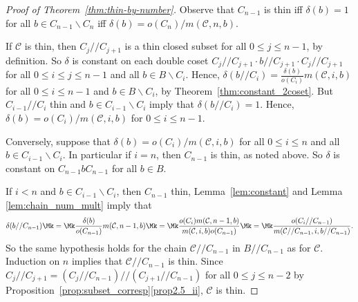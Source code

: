 \begin{proof} [Proof of Theorem~\ref{thm:thin-by-number}]

Observe that $C_{n-1}$ is thin iff $\delta(b) = 1$ for all $b \in
C_{n-1}\backslash C_n$ iff $\delta(b) =
o(C_n)/m(\mathcal{C}, n, b)$.

If $\mathcal{C}$ is thin, then $C_j//C_{j+1}$ is a thin closed subset
for all $0 \leq j \leq n-1$, by definition. So $\delta$ is constant on
each double coset $C_j//C_{j+1}\cdot b//C_{j+1}\cdot C_j//C_{j+1}$ for
all $0 \leq i \leq j \leq n-1$ and all $b \in B\backslash C_i$. Hence, $\delta(b//C_i) =
\frac{\delta(b)}{o(C_i)}m(\mathcal{C}, i, b)$ for all $0 \leq i \leq
n-1$ and $b \in B\backslash C_i$, by Theorem~\ref{thm:constant_2coset}.
But $C_{i-1}//C_i$ thin and $b \in C_{i-1}\backslash C_i$ imply that
$\delta(b//C_i) = 1$. Hence, $\delta(b) = o(C_i)/m(\mathcal{C},
i, b)$ for $0 \leq i \leq n-1$.

Conversely, suppose that $\delta(b) = o(C_i)/m(\mathcal{C}, i, b)$ for
all $0 \leq i \leq n$ and all $b \in C_{i-1}\backslash C_i$. In
particular if $i = n$, then $C_{n-1}$ is thin, as noted above. So
$\delta$ is constant on $C_{n-1}bC_{n-1}$ for all $b \in B$.

If $i < n$ and $b \in C_{i-1}\backslash C_i$, then $C_{n-1}$ thin, Lemma~\ref{lem:constant} and Lemma
\ref{lem:chain_num_mult} imply that
\[
\delta(b//C_{n-1}) \Mk = \Mk  \frac{\delta(b)}{o(C_{n-1})}m(\mathcal{C}, n-1,
b) \Mk =\Mk  \frac{o(C_i)m(\mathcal{C}, n-1, b)}{m(\mathcal{C}, i, b)o(C_{n-1})}
\Mk =\Mk  \frac{o(C_i//C_{n-1})}{m(\mathcal{C}//C_{n-1}, i, b//C_{n-1})}.
\]
So the same hypothesis holds for the chain $\mathcal{C}//C_{n-1}$ in
$B//C_{n-1}$ as for $\mathcal{C}$. Induction on $n$ implies that
$\mathcal{C}//C_{n-1}$ is thin. Since $C_j//C_{j+1} =
(C_j//C_{n-1})//(C_{j+1}//C_{n-1})$ for all $0 \leq j \leq n-2$ by
Proposition~\ref{prop:subset_corresp}\ref{prop2.5_ii}, $\mathcal{C}$ is thin.
\end{proof}

